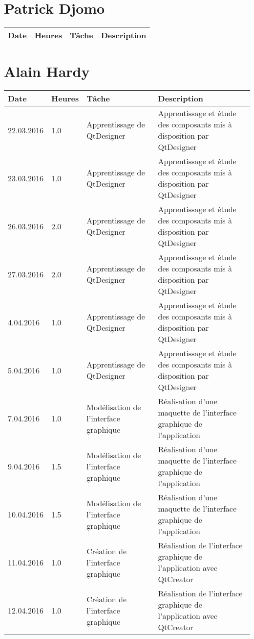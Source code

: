 \documentclass[french]{article}
\begin{document}
	\section*{Patrick Djomo}
	\begin{longtable}{p{}|p{}|p{}|p{}}
		Date&Heures&Tâche&Description\\
		\hline
	\end{longtable}
	
	\section*{Alain Hardy}
	\begin{longtable}{p{}|p{}|p{}|p{}}
		Date&Heures&Tâche&Description\\
		\hline\hline
		22.03.2016 & 1.0 & Apprentissage de QtDesigner & Apprentissage et étude des composants mis à disposition par QtDesigner\\
		23.03.2016 & 1.0 & Apprentissage de QtDesigner & Apprentissage et étude des composants mis à disposition par QtDesigner\\
		26.03.2016 & 2.0 & Apprentissage de QtDesigner & Apprentissage et étude des composants mis à disposition par QtDesigner\\
		27.03.2016 & 2.0 & Apprentissage de QtDesigner & Apprentissage et étude des composants mis à disposition par QtDesigner\\
		\hline
		4.04.2016 & 1.0 & Apprentissage de QtDesigner & Apprentissage et étude des composants mis à disposition par QtDesigner\\
		5.04.2016 & 1.0 & Apprentissage de QtDesigner & Apprentissage et étude des composants mis à disposition par QtDesigner\\
		7.04.2016 & 1.0 & Modélisation de l'interface graphique & Réalisation d'une maquette de l'interface graphique de l'application\\
		9.04.2016 & 1.5 & Modélisation de l'interface graphique & Réalisation d'une maquette de l'interface graphique de l'application\\
		10.04.2016 & 1.5 & Modélisation de l'interface graphique & Réalisation d'une maquette de l'interface graphique de l'application\\
		\hline
		11.04.2016 & 1.0 & Création de l'interface graphique & Réalisation de l'interface graphique de l'application avec QtCreator\\
		12.04.2016 & 1.0 & Création de l'interface graphique & Réalisation de l'interface graphique de l'application avec QtCreator\\

\end{longtable}
\end{document}
